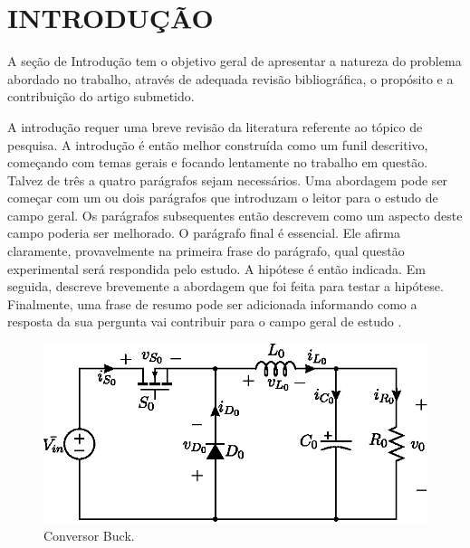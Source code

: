 %


\section{INTRODUÇÃO}


A seção de Introdução tem o objetivo geral de apresentar a natureza do problema abordado no trabalho, através de adequada revisão bibliográfica, o propósito e a contribuição do artigo submetido.

A introdução requer uma breve revisão da literatura referente ao tópico de pesquisa. A introdução é então melhor construída como um funil descritivo, começando com temas gerais e focando lentamente no trabalho em questão. Talvez de três a quatro parágrafos sejam necessários. Uma abordagem pode ser começar com um ou dois parágrafos que introduzam o leitor para o estudo de campo geral. Os parágrafos subsequentes então descrevem como um aspecto deste campo poderia ser melhorado. O parágrafo final é essencial. Ele afirma claramente, provavelmente na primeira frase do parágrafo, qual questão experimental será respondida pelo estudo. A hipótese é então indicada. Em seguida, descreve brevemente a abordagem que foi feita para testar a hipótese. Finalmente, uma frase de resumo pode ser adicionada informando como a resposta da sua pergunta vai contribuir para o campo geral de estudo .

\begin{figure}[!h]
	\centering
	\includegraphics[width=1\linewidth]{Figs/BuckConv}
	\caption{Conversor Buck.}
	\label{fig:buck}
\end{figure}

